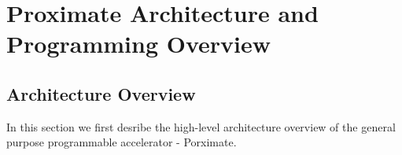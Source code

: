 \section{Proximate Architecture and Programming Overview} \label{sec:arch}



\subsection{Architecture Overview}
In this section we first desribe the high-level architecture 
overview of the general purpose programmable accelerator - Porximate. 




